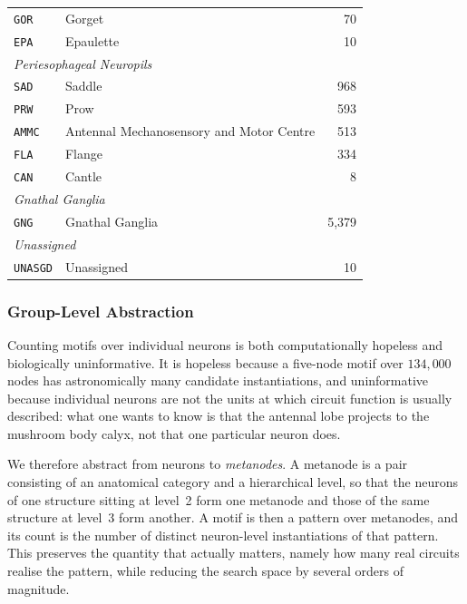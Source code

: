 \documentclass[12pt,a4paper,oneside]{article}
\theoremstyle{definition}
\theoremstyle{plain}
\newcommand{\code}[1]{\texttt{#1}}
\begin{document}
\begin{table}[t]
\begin{minipage}[t]{0.49\textwidth}
\begin{tabular}{llr}
\code{GOR} & Gorget & 70 \\
\code{EPA} & Epaulette & 10 \\
\midrule
\multicolumn{3}{l}{\textit{Periesophageal Neuropils}} \\
\code{SAD} & Saddle & 968 \\
\code{PRW} & Prow & 593 \\
\code{AMMC} & Antennal Mechanosensory and Motor Centre & 513 \\
\code{FLA} & Flange & 334 \\
\code{CAN} & Cantle & 8 \\
\midrule
\multicolumn{3}{l}{\textit{Gnathal Ganglia}} \\
\code{GNG} & Gnathal Ganglia & 5{,}379 \\
\midrule
\multicolumn{3}{l}{\textit{Unassigned}} \\
\code{UNASGD} & Unassigned & 10 \\
\bottomrule
\end{tabular}
\end{minipage}
\end{table}

\subsubsection{Group-Level Abstraction}
\label{sec:groups}

Counting motifs over individual neurons is both computationally hopeless and
biologically uninformative. It is hopeless because a five-node motif over
$134{,}000$ nodes has astronomically many candidate instantiations, and
uninformative because individual neurons are not the units at which circuit
function is usually described: what one wants to know is that the antennal
lobe projects to the mushroom body calyx, not that one particular neuron
does.

We therefore abstract from neurons to \emph{metanodes}. A metanode is a pair
consisting of an anatomical category and a hierarchical level, so that the
neurons of one structure sitting at level~2 form one metanode and those of
the same structure at level~3 form another. A motif is then a pattern over
metanodes, and its count is the number of distinct neuron-level
instantiations of that pattern. This preserves the quantity that actually
matters, namely how many real circuits realise the pattern, while reducing
the search space by several orders of magnitude.
\end{document}
